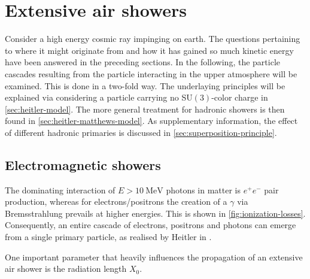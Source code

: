 

\chapter{Extensive air showers}
\label{chapter:extensive-air-showers}

Consider a high energy cosmic ray impinging on earth. The questions pertaining to where it might originate from and how it has gained so much kinetic energy have 
been answered in the preceding sections. In the following, the particle cascades resulting from the particle interacting in the upper atmosphere will be examined. 
This is done in a two-fold way. The underlaying principles will be explained via considering a particle carrying no SU$(3)$-color charge in 
\autoref{sec:heitler-model}. The more general treatment for hadronic showers is then found in \autoref{sec:heitler-matthews-model}. As supplementary information, 
the effect of different hadronic primaries is discussed in \autoref{sec:superposition-principle}.

\section{Electromagnetic showers}
\label{sec:heitler-model}

The dominating interaction of $E > \SI{10}{\mega\electronvolt}$ photons in matter is $e^+e^-$ pair production, whereas for electrons/positrons the creation of a
$\gamma$ via Bremsstrahlung prevails at higher energies. This is shown in \autoref{fig:ionization-losses}. Consequently, an entire cascade of electrons, positrons 
and photons can emerge from a single primary particle, as realised by Heitler in \cite{heitler1984quantum}.

One important parameter that heavily influences the propagation of an extensive air shower is the radiation length $X_0$.

